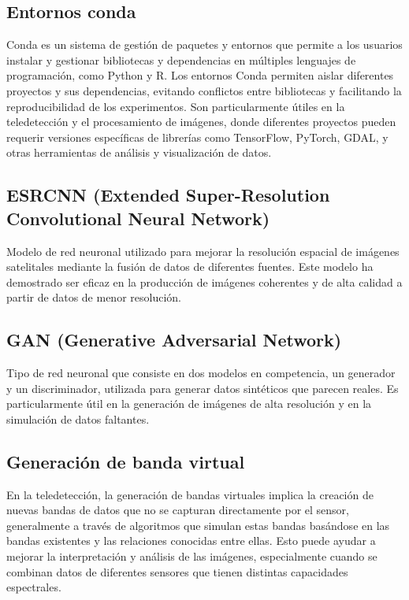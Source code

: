            \subsection{Entornos conda}
                Conda es un sistema de gestión de paquetes y entornos que permite a los usuarios instalar y gestionar bibliotecas y dependencias en múltiples lenguajes de programación, como Python y R. Los entornos Conda permiten aislar diferentes proyectos y sus dependencias, evitando conflictos entre bibliotecas y facilitando la reproducibilidad de los experimentos. Son particularmente útiles en la teledetección y el procesamiento de imágenes, donde diferentes proyectos pueden requerir versiones específicas de librerías como TensorFlow, PyTorch, GDAL, y otras herramientas de análisis y visualización de datos.
                

            \subsection{ESRCNN (Extended Super-Resolution Convolutional Neural Network)}
                Modelo de red neuronal utilizado para mejorar la resolución espacial de imágenes satelitales mediante la fusión de datos de diferentes fuentes. Este modelo ha demostrado ser eficaz en la producción de imágenes coherentes y de alta calidad a partir de datos de menor resolución.
            
            \subsection{GAN (Generative Adversarial Network)}
                Tipo de red neuronal que consiste en dos modelos en competencia, un generador y un discriminador, utilizada para generar datos sintéticos que parecen reales. Es particularmente útil en la generación de imágenes de alta resolución y en la simulación de datos faltantes.
            
            \subsection{Generación de banda virtual}
                En la teledetección, la generación de bandas virtuales implica la creación de nuevas bandas de datos que no se capturan directamente por el sensor, generalmente a través de algoritmos que simulan estas bandas basándose en las bandas existentes y las relaciones conocidas entre ellas. Esto puede ayudar a mejorar la interpretación y análisis de las imágenes, especialmente cuando se combinan datos de diferentes sensores que tienen distintas capacidades espectrales.
            
